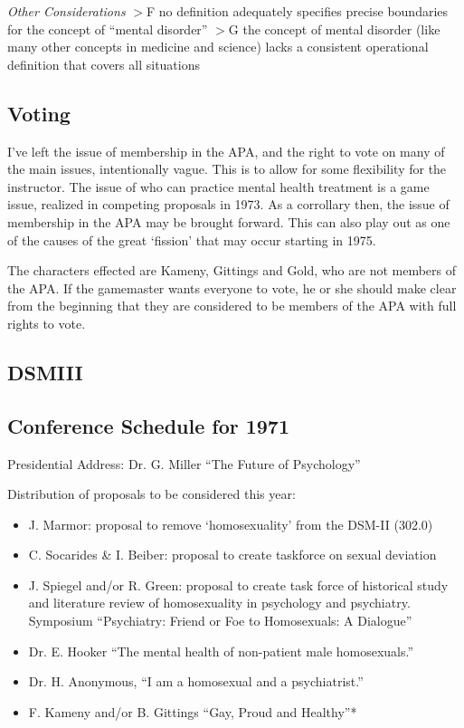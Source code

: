 \emph{Other Considerations}
 $>$F no definition adequately specifies precise boundaries for the concept of “mental disorder”
 $>$G the concept of mental disorder (like many other concepts in medicine and science) lacks a consistent operational definition that covers all situations

\subsection{Voting}
\label{voting}

I've left the issue of membership in the APA, and the right to vote on many of the main issues, intentionally vague. This is to allow for some flexibility for the instructor. The issue of who can practice mental health treatment is a game issue, realized in competing proposals in 1973. As a corrollary then, the issue of membership in the APA may be brought forward. This can also play out as one of the causes of the great `fission' that may occur starting in 1975.

The characters effected are Kameny, Gittings and Gold, who are not members of the APA. If the gamemaster wants everyone to vote, he or she should make clear from the beginning that they are considered to be members of the APA with full rights to vote. 

\subsection{DSMIII}
\label{dsmiii}

\subsection{Conference Schedule for 1971}
\label{conferenceschedulefor1971}

Presidential Address: Dr. G. Miller “The Future of Psychology”

Distribution of proposals to be considered this year:

\begin{itemize}
\item J. Marmor: proposal to remove `homosexuality' from the DSM-II (302.0)

\item C. Socarides \& I. Beiber: proposal to create taskforce on sexual deviation

\item J. Spiegel and\slash or R. Green: proposal to create task force of historical study and literature review of homosexuality in psychology and psychiatry.
Symposium “Psychiatry: Friend or Foe to Homosexuals: A Dialogue” 

\item Dr. E. Hooker “The mental health of non-patient male homosexuals.”

\item Dr. H. Anonymous, “I am a homosexual and a psychiatrist.”

\item F. Kameny and\slash or B. Gittings “Gay, Proud and Healthy”*

\end{itemize}

